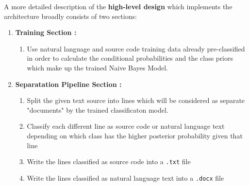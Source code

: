 \documentclass[12pt]{scrreprt}
\begin{document}
A more detailed description of the \textbf{high-level design} which implements the architecture broadly consists of two sections:
\begin{enumerate}
    \item \textbf{Training Section : }
    \begin{enumerate}
        \item Use natural language and source code training data already pre-classified in order to calculate the conditional probabilities and the class priors which make up the trained Naive Bayes Model.
    \end{enumerate}
    



    \item \textbf{Separatation Pipeline Section : }
    \begin{enumerate}
        \item Split the given text source into lines which will be considered as separate "documents" by the trained classificaton model.
        \item Classify each different line as source code or natural language text depending on which class has the higher posterior probability given that line
        \item Write the lines classified as source code into a \texttt{.txt} file
        \item Write the lines classified as natural language text into a \texttt{.docx} file

\end{enumerate}
\end{enumerate}
\end{document}
